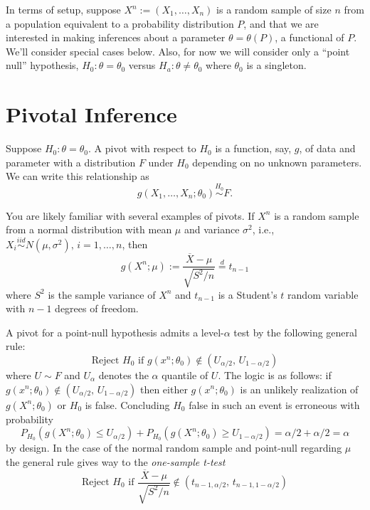 \documentclass[
]{book}
\theoremstyle{definition}
\theoremstyle{definition}
\theoremstyle{definition}
\theoremstyle{definition}
\theoremstyle{remark}
\begin{document}
In terms of setup, suppose \(X^n := (X_1, \ldots, X_n)\) is a random sample of size \(n\) from a population equivalent to a probability distribution \(P\), and that we are interested in making inferences about a parameter \(\theta = \theta(P)\), a functional of \(P\). We'll consider special cases below. Also, for now we will consider only a ``point null'' hypothesis, \(H_0: \theta = \theta_0\) versus \(H_a:\theta \ne \theta_0\) where \(\theta_0\) is a singleton.

\hypertarget{pivotal-inference}{%
\section{Pivotal Inference}\label{pivotal-inference}}

Suppose \(H_0:\theta = \theta_0\). A pivot with respect to \(H_0\) is a function, say, \(g\), of data and parameter with a distribution \(F\) under \(H_0\) depending on no unknown parameters. We can write this relationship as
\[g(X_1, \ldots, X_n;\theta_0)\stackrel{H_0}\sim F.\]

You are likely familiar with several examples of pivots. If \(X^n\) is a random sample from a normal distribution with mean \(\mu\) and variance \(\sigma^2\), i.e., \(X_i\stackrel{iid}{\sim}N(\mu, \sigma^2), \,i=1,\ldots, n\), then
\[g(X^n;\mu):=\frac{\overline X - \mu}{\sqrt{S^2/n}}\stackrel{d}{=}t_{n-1}\]
where \(S^2\) is the sample variance of \(X^n\) and \(t_{n-1}\) is a Student's \(t\) random variable with \(n-1\) degrees of freedom.

A pivot for a point-null hypothesis admits a level-\(\alpha\) test by the following general rule:
\[\text{Reject }H_0\text{ if }g(x^n;\theta_0)\notin(U_{\alpha/2}, \, U_{1-\alpha/2})\]
where \(U\sim F\) and \(U_\alpha\) denotes the \(\alpha\) quantile of \(U\). The logic is as follows: if \(g(x^n;\theta_0)\notin(U_{\alpha/2}, \, U_{1-\alpha/2})\) then either \(g(x^n;\theta_0)\) is an unlikely realization of \(g(X^n;\theta_0)\) or \(H_0\) is false. Concluding \(H_0\) false in such an event is erroneous with probability
\[P_{H_0}(g(X^n;\theta_0)\leq U_{\alpha/2}) + P_{H_0}(g(X^n;\theta_0)\geq U_{1-\alpha/2}) = \alpha/2 + \alpha/2 = \alpha\]
by design. In the case of the normal random sample and point-null regarding \(\mu\) the general rule gives way to the \emph{one-sample t-test}
\[\text{Reject }H_0\text{ if }\frac{\overline X - \mu}{\sqrt{S^2/n}}\notin(t_{n-1, \alpha/2}, \, t_{n-1, 1-\alpha/2})\]
\end{document}
